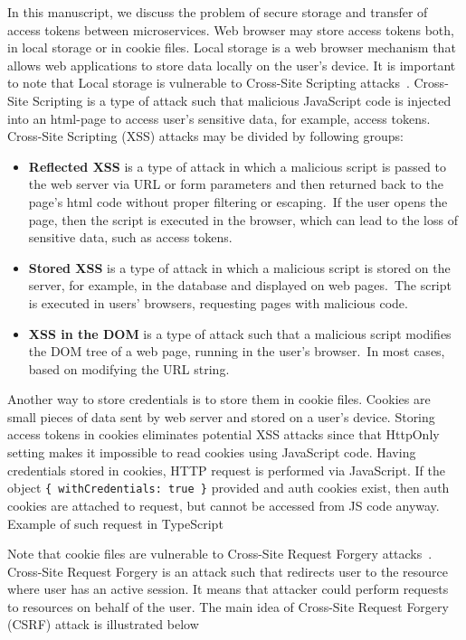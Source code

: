 In this manuscript, we discuss the problem of secure storage and transfer of access tokens between microservices.
Web browser may store access tokens both, in local storage or in cookie files.
Local storage is a web browser mechanism that allows web applications to store data locally on the user's device.
It is important to note that Local storage is vulnerable to Cross-Site Scripting attacks~\cite{spett2005cross}.
Cross-Site Scripting is a type of attack such that malicious JavaScript code is injected into an html-page
to access user's sensitive data, for example, access tokens.
Cross-Site Scripting (XSS) attacks may be divided by following groups:

\begin{itemize}
    \item \textbf{Reflected XSS} is a type of attack in which a malicious
    script is passed to the web server via URL or form parameters and then returned back to the page's html code
    without proper filtering or escaping.\ If the user opens the page, then the script is executed
    in the browser, which can lead to the loss of sensitive data, such as access tokens.
    \item \textbf{Stored XSS} is a type of attack in which a malicious script is stored on the server, for example,
    in the database and displayed on web pages.\ The script is executed in users' browsers,
    requesting pages with malicious code.
    \item \textbf{XSS in the DOM} is a type of attack such that a malicious script modifies the DOM tree of a web page,
    running in the user's browser.\ In most cases, based on modifying the URL string.
\end{itemize}

Another way to store credentials is to store them in cookie files.
Cookies are small pieces of data sent by web server and stored on a user's device.
Storing access tokens in cookies eliminates potential XSS attacks since that HttpOnly setting
makes it impossible to read cookies using JavaScript code.
Having credentials stored in cookies, HTTP request is performed via JavaScript.
If the object \texttt{\{ withCredentials: true \}} provided and auth cookies exist, then auth cookies are attached to request,
but cannot be accessed from JS code anyway.
Example of such request in TypeScript



Note that cookie files are vulnerable to Cross-Site Request Forgery attacks~\cite{siddiqui2011cross}.
Cross-Site Request Forgery is an attack such that redirects user to the resource where user has an active session.
It means that attacker could perform requests to resources on behalf of the user.
The main idea of Cross-Site Request Forgery (CSRF) attack is illustrated below

